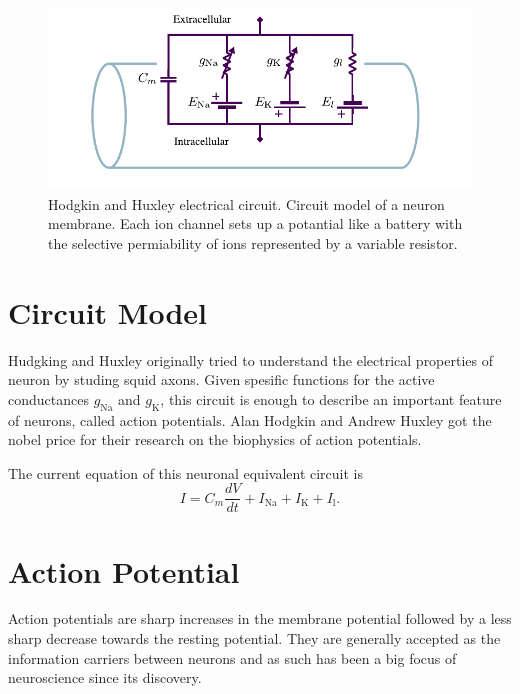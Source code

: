 \documentclass[altfont, fleqn]{uiophd}
\begin{document}
\begin{figure}[h]
    \centering
    \includegraphics[width=1.0\textwidth]{images/2_1/compartment.pdf}
    \caption{Hodgkin and Huxley electrical circuit. 
    Circuit model of a neuron membrane. 
    Each ion channel sets up a potantial like a battery with the 
    selective permiability of ions represented by a variable resistor. 
    }
    \label{fig:2_hud_hux}
\end{figure}

\section{Circuit Model}
Hudgking and Huxley originally tried to understand the
electrical properties of neuron by studing squid axons. 
Given spesific functions for the active conductances $g_\text{Na}$
and $g_\text{K}$, this circuit is enough to describe an important feature
of neurons, called action potentials.
Alan Hodgkin and Andrew Huxley got the nobel price for their
research on the biophysics of action potentials. 

The current equation of this neuronal equivalent circuit is
$$I = C_m \frac{dV}{dt} + I_\text{Na} + I_\text{K} + I_\text{l}.$$





\section{Action Potential}
Action potentials are sharp increases in the membrane potential
followed by a less sharp decrease towards the resting potential. 
They are generally accepted as the information carriers between neurons
and as such has been a big focus of neuroscience since its discovery.
\end{document}
